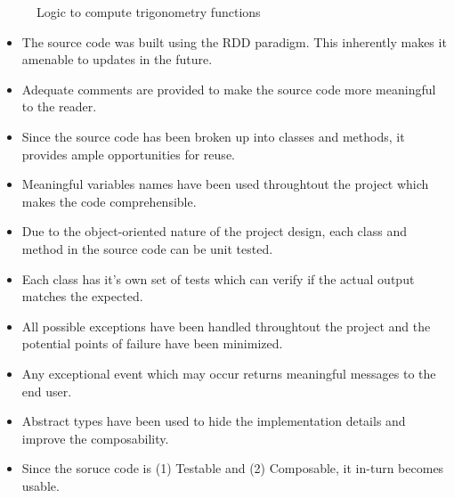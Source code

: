    \begin{figure}[h!]
      \centering
      \caption{Logic to compute trigonometry functions}
      \label{fig:trigonometric Functions}
    \end{figure}
    \pagebreak

    \begin{itemize}
      \item {The source code was built using the RDD paradigm. This inherently makes it amenable to updates in the future.}
      \item {Adequate comments are provided to make the source code more meaningful to the reader.}
      \item {Since the source code has been broken up into classes and methods, it provides ample opportunities for reuse.}
      \item {Meaningful variables names have been used throughtout the project which makes the code comprehensible.}
      \item {Due to the object-oriented nature of the project design, each class and method in the source code can be unit tested. }
      \item {Each class has it's own set of tests which can verify if the actual output matches the expected.}
      \item {All possible exceptions have been handled throughtout the project and the potential points of failure have been minimized.}
      \item {Any exceptional event which may occur returns meaningful messages to the end user.}
      \item Abstract types have been used to hide the implementation details and improve the composability.
      \item Since the soruce code is (1) Testable and (2) Composable, it in-turn becomes usable. 
    \end{itemize}

